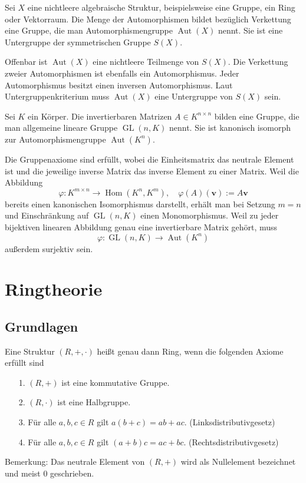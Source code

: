 \begin{Korollar}
Sei $X$ eine nichtleere algebraische Struktur, beispielsweise eine
Gruppe, ein Ring oder Vektorraum. Die Menge der Automorphismen bildet
bezüglich Verkettung eine Gruppe, die man Automorphismengruppe
$\operatorname{Aut}(X)$ nennt. Sie ist eine Untergruppe der
symmetrischen Gruppe $S(X)$.  
\end{Korollar}
\begin{Beweis}
Offenbar ist $\operatorname{Aut}(X)$ eine nichtleere Teilmenge von
$S(X)$. Die Verkettung zweier Automorphismen ist ebenfalls ein
Automorphismus. Jeder Automorphismus besitzt einen inversen
Automorphismus. Laut Untergruppenkriterium muss $\operatorname{Aut}(X)$
eine Untergruppe von $S(X)$ sein.\,\qedsymbol
\end{Beweis}

\begin{Korollar}
Sei $K$ ein Körper. Die invertierbaren Matrizen $A\in K^{n\times n}$
bilden eine Gruppe, die man allgemeine lineare Gruppe
$\operatorname{GL}(n,K)$ nennt. Sie ist kanonisch isomorph zur
Automorphismengruppe $\operatorname{Aut}(K^n)$.
\end{Korollar}
\begin{Beweis}
Die Gruppenaxiome sind erfüllt, wobei die Einheitsmatrix das
neutrale Element ist und die jeweilige inverse Matrix das
inverse Element zu einer Matrix. Weil die Abbildung%
\[\varphi\colon K^{m\times n}\to\operatorname{Hom}(K^n,K^m),\quad
\varphi(A)(\mathbf v) := A\mathbf v\]
bereits einen kanonischen Isomorphismus darstellt, erhält man bei
Setzung $m=n$ und Einschränkung auf $\operatorname{GL}(n,K)$
einen Monomorphismus. Weil zu jeder bijektiven linearen Abbildung genau
eine invertierbare Matrix gehört, muss%
\[\varphi\colon\operatorname{GL}(n,K)\to\operatorname{Aut}(K^n)\]
außerdem surjektiv sein.\,\qedsymbol
\end{Beweis}

\newpage
\section{Ringtheorie}

\subsection{Grundlagen}

\begin{Definition}[Ring]
Eine Struktur $(R,+,\cdot)$ heißt genau dann Ring, wenn die folgenden
Axiome erfüllt sind
\begin{enumerate}
\item[1.] $(R,+)$ ist eine kommutative Gruppe.
\item[2.] $(R,\cdot)$ ist eine Halbgruppe.
\item[3.] Für alle $a,b,c\in R$ gilt $a(b+c) = ab+ac$. (Linksdistributivgesetz)
\item[4.] Für alle $a,b,c\in R$ gilt $(a+b)c = ac+bc$. (Rechtsdistributivgesetz)
\end{enumerate}
\end{Definition}
Bemerkung: Das neutrale Element von $(R,+)$ wird als Nullelement
bezeichnet und meist $0$ geschrieben.

